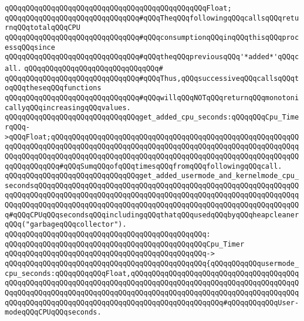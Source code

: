 \verb|qQQqqQQqqQQqqQQqqQQqqQQqqQQqqQQqqQQqqQQqqQQqqQQqFloat;|\newline
\newline
\newline
\newline
\verb|qQQqqQQqqQQqqQQqqQQqqQQqqQQqqQQq#qQQqTheqQQqfollowingqQQqcallsqQQqreturnqQQqtotalqQQqCPU|\newline
\verb|qQQqqQQqqQQqqQQqqQQqqQQqqQQqqQQq#qQQqconsumptionqQQqinqQQqthisqQQqprocessqQQqsince|\newline
\verb|qQQqqQQqqQQqqQQqqQQqqQQqqQQqqQQq#qQQqtheqQQqpreviousqQQq'*added*'qQQqcall.|\newline
\verb|qQQqqQQqqQQqqQQqqQQqqQQqqQQqqQQq#|\newline
\verb|qQQqqQQqqQQqqQQqqQQqqQQqqQQqqQQq#qQQqThus,qQQqsuccessiveqQQqcallsqQQqtoqQQqtheseqQQqfunctions|\newline
\verb|qQQqqQQqqQQqqQQqqQQqqQQqqQQqqQQq#qQQqwillqQQqNOTqQQqreturnqQQqmonotonicallyqQQqincreasingqQQqvalues.|\newline
\newline
\verb|qQQqqQQqqQQqqQQqqQQqqQQqqQQqqQQqget_added_cpu_seconds:qQQqqQQqCpu_TimerqQQq->qQQqFloat;qQQqqQQqqQQqqQQqqQQqqQQqqQQqqQQqqQQqqQQqqQQqqQQqqQQqqQQqqQQqqQQqqQQqqQQqqQQqqQQqqQQqqQQqqQQqqQQqqQQqqQQqqQQqqQQqqQQqqQQqqQQqqQQqqQQqqQQqqQQqqQQqqQQqqQQqqQQqqQQqqQQqqQQqqQQqqQQqqQQqqQQqqQQqqQQqqQQqqQQqqQQqqQQqqQQq#qQQqSumqQQqofqQQqtimesqQQqfromqQQqfollowingqQQqcall.|\newline
\newline
\verb|qQQqqQQqqQQqqQQqqQQqqQQqqQQqqQQqget_added_usermode_and_kernelmode_cpu_secondsqQQqqQQqqQQqqQQqqQQqqQQqqQQqqQQqqQQqqQQqqQQqqQQqqQQqqQQqqQQqqQQqqQQqqQQqqQQqqQQqqQQqqQQqqQQqqQQqqQQqqQQqqQQqqQQqqQQqqQQqqQQqqQQqqQQqqQQqqQQqqQQqqQQqqQQqqQQqqQQqqQQqqQQqqQQqqQQqqQQqqQQqqQQqqQQqqQQqqQQqqQQq#qQQqCPUqQQqsecondsqQQqincludingqQQqthatqQQqusedqQQqbyqQQqheapcleanerqQQq("garbageqQQqcollector").|\newline
\verb|qQQqqQQqqQQqqQQqqQQqqQQqqQQqqQQqqQQqqQQqqQQqqQQq:|\newline
\verb|qQQqqQQqqQQqqQQqqQQqqQQqqQQqqQQqqQQqqQQqqQQqqQQqCpu_Timer|\newline
\verb|qQQqqQQqqQQqqQQqqQQqqQQqqQQqqQQqqQQqqQQqqQQqqQQq->|\newline
\verb|qQQqqQQqqQQqqQQqqQQqqQQqqQQqqQQqqQQqqQQqqQQqqQQq{qQQqqQQqqQQqusermode_cpu_seconds:qQQqqQQqqQQqFloat,qQQqqQQqqQQqqQQqqQQqqQQqqQQqqQQqqQQqqQQqqQQqqQQqqQQqqQQqqQQqqQQqqQQqqQQqqQQqqQQqqQQqqQQqqQQqqQQqqQQqqQQqqQQqqQQqqQQqqQQqqQQqqQQqqQQqqQQqqQQqqQQqqQQqqQQqqQQqqQQqqQQqqQQqqQQqqQQqqQQqqQQqqQQqqQQqqQQqqQQqqQQqqQQqqQQqqQQqqQQqqQQqqQQqqQQq#qQQqqQQqqQQqUser-modeqQQqCPUqQQqseconds.|\newline
